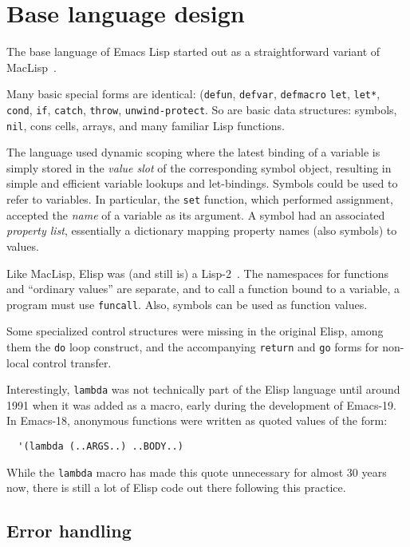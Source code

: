 \documentclass[format=acmsmall, review=false, screen=true]{acmart}
\newcommand \Elisp {Elisp}
\begin{document}
\section{Base language design}
\label{sec:base-language-design}

The base language of Emacs Lisp started out as a straightforward
variant of MacLisp~\cite{Moon1974,Pitman1983}.

Many basic special forms are identical: (\texttt{defun},
\texttt{defvar}, \texttt{defmacro} \texttt{let}, \texttt{let*},
\texttt{cond}, \texttt{if}, \texttt{catch}, \texttt{throw},
\texttt{unwind-protect}.  So are basic data structures: symbols,
\texttt{nil}, cons cells, arrays, and many familiar Lisp
functions.

The language used dynamic scoping where the latest binding of a variable is
simply stored in the \emph{value slot} of the corresponding symbol object,
resulting in simple and efficient variable lookups and let-bindings.
Symbols could be used to refer to variables.  In particular, the
\texttt{set} function, which performed assignment, accepted the
\emph{name} of a variable as its argument.  A symbol had an associated
\emph{property list}, essentially a dictionary mapping property
names (also symbols) to values.

Like MacLisp, \Elisp{} was (and still is) a
Lisp-2~\cite{SteeleGabriel1993}.  The namespaces for functions and
``ordinary values'' are separate, and to call a function bound to a
variable, a program must use \texttt{funcall}.  Also, symbols can be
used as function values.

Some specialized control structures were missing in the original
\Elisp{}, among them the \texttt{do} loop construct, and the
accompanying \texttt{return} and \texttt{go} forms for non-local
control transfer.

Interestingly, \texttt{lambda} was not technically part of the \Elisp{}
language until around 1991 when it was added as a macro, early during the
development of Emacs-19.  In Emacs-18, anonymous functions were written
as quoted values of the form:
\begin{verbatim}
  '(lambda (..ARGS..) ..BODY..)
\end{verbatim}
While the \texttt{lambda} macro has made this quote unnecessary for almost
30 years now, there is still a lot of \Elisp{} code out there following
this practice.


\subsection{Error handling}
\label{sec:error-handling}
\end{document}
